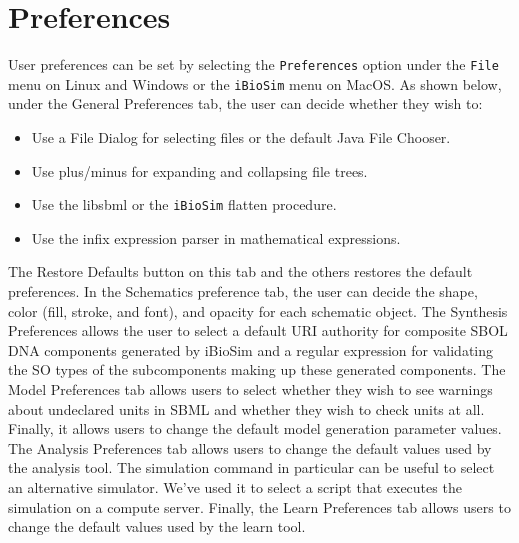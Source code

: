 \documentclass[titlepage,11pt]{article}
\begin{document}
\clearpage

\section{\label{Preferences}Preferences}

\noindent
User preferences can be set by selecting the {\tt Preferences} option under the {\tt File} menu on Linux and Windows or the {\tt iBioSim} menu on MacOS.  As shown below, under the General Preferences tab, the user can decide whether they wish to:
\begin{itemize}
\item Use a File Dialog for selecting files or the default Java File Chooser.  
\item Use plus/minus for expanding and collapsing file trees.  
\item Use the libsbml or the {\tt iBioSim} flatten procedure.
\item Use the infix expression parser in mathematical expressions.
\end{itemize}
The Restore Defaults button on this tab and the others restores the default preferences.  In the Schematics preference tab, the user can decide the shape, color (fill, stroke, and font), and opacity for each schematic object.  The Synthesis Preferences allows the user to select a default URI authority for composite SBOL DNA components generated by iBioSim and a regular expression for validating the SO types of the subcomponents making up these generated components.  The Model Preferences tab allows users to select whether they wish to see warnings about undeclared units in SBML and whether they wish to check units at all.  Finally, it allows users to change the default model generation parameter values.  The Analysis Preferences tab allows users to change the default values used by the analysis tool.  The simulation command in particular can be useful to select an alternative simulator.  We've used it to select a script that executes the simulation on a compute server.  Finally, the Learn Preferences tab allows users to change the default values used by the learn tool.
\end{document}
